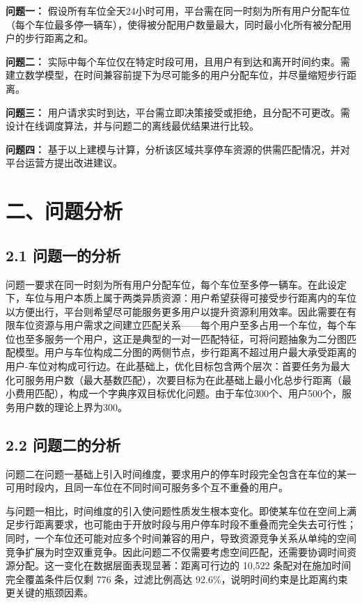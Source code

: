 \documentclass{ctexart}
\begin{document}
\textbf{问题一：} 假设所有车位全天24小时可用，平台需在同一时刻为所有用户分配车位（每个车位最多停一辆车），使得被分配用户数量最大，同时最小化所有被分配用户的步行距离之和。

\textbf{问题二：} 实际中每个车位仅在特定时段可用，且用户有到达和离开时间约束。需建立数学模型，在时间兼容前提下为尽可能多的用户分配车位，并尽量缩短步行距离。

\textbf{问题三：} 用户请求实时到达，平台需立即决策接受或拒绝，且分配不可更改。需设计在线调度算法，并与问题二的离线最优结果进行比较。

\textbf{问题四：} 基于以上建模与计算，分析该区域共享停车资源的供需匹配情况，并对平台运营方提出改进建议。

\section*{二、问题分析}

\subsection*{2.1 问题一的分析}

问题一要求在同一时刻为所有用户分配车位，每个车位至多停一辆车。在此设定下，车位与用户本质上属于两类异质资源：用户希望获得可接受步行距离内的车位以方便出行，平台则希望尽可能服务更多用户以提升资源利用效率。因此需要在有限车位资源与用户需求之间建立匹配关系——每个用户至多占用一个车位，每个车位也至多服务一个用户，这正是典型的一对一匹配特征，可将问题抽象为二分图匹配模型\cite{1}。用户与车位构成二分图的两侧节点，步行距离不超过用户最大承受距离的用户-车位对构成可行边。在此基础上，优化目标包含两个层次：首要任务为最大化可服务用户数（最大基数匹配），次要目标为在此基础上最小化总步行距离（最小费用匹配），构成一个字典序双目标优化问题。由于车位300个、用户500个，服务用户数的理论上界为300。

\subsection*{2.2 问题二的分析}

问题二在问题一基础上引入时间维度，要求用户的停车时段完全包含在车位的某一可用时段内，且同一车位在不同时间可服务多个互不重叠的用户。

与问题一相比，时间维度的引入使问题性质发生根本变化。即使某车位在空间上满足步行距离要求，也可能由于开放时段与用户停车时段不重叠而完全失去可行性；同时，一个车位还可能对应多个时间兼容的用户，导致资源竞争关系从单纯的空间竞争扩展为时空双重竞争。因此问题二不仅需要考虑空间匹配，还需要协调时间资源分配。这一变化在数据层面表现显著：距离可行边的 10,522 条配对在施加时间完全覆盖条件后仅剩 776 条，过滤比例高达 92.6\%，说明时间约束是比距离约束更关键的瓶颈因素。
\end{document}

